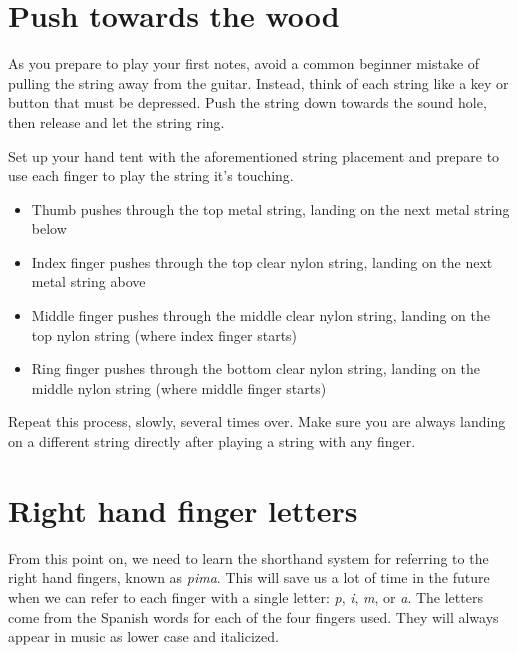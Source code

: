 \begin{center}
\end{center}


\section{Push towards the wood}

As you prepare to play your first notes, avoid a common beginner mistake of pulling the string away from the guitar. Instead, think of each string like a key or button that must be depressed. Push the string down towards the sound hole, then release and let the string ring. 

Set up your hand tent with the aforementioned string placement and prepare to use each finger to play the string it's touching. 

\begin{itemize}
	
	\item Thumb pushes through the top metal string, landing on the next metal string below
	
	\item Index finger pushes through the top clear nylon string, landing on the next metal string above
	
	\item Middle finger pushes through the middle clear nylon string, landing on the top nylon string (where index finger starts)
	
	\item Ring finger pushes through the bottom clear nylon string, landing on the middle nylon string (where middle finger starts) 
	
\end{itemize} 

Repeat this process, slowly, several times over. Make sure you are always landing on a different string directly after playing a string with any finger.

\section{Right hand finger letters}

From this point on, we need to learn the shorthand system for referring to the right hand fingers, known as \textit{pima}. This will save us a lot of time in the future when we can refer to each finger with a single letter: \textit{p}, \textit{i}, \textit{m}, or \textit{a}. The letters come from the Spanish words for each of the four fingers used. They will always appear in music as lower case and italicized.

